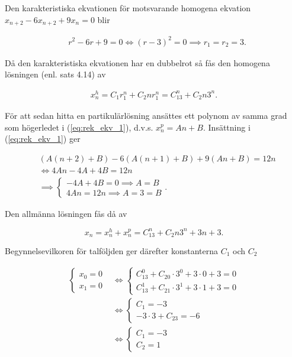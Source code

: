 \documentclass[a4paper]{article}
\begin{document}
Den karakteristiska ekvationen för motsvarande homogena ekvation $x_{n+2} - 6x_{n+2} + 9x_n = 0$ blir

\begin{align*}
	&r^2 - 6r + 9 = 0 \iff (r - 3)^2 = 0 \implies r_1 = r_2 = 3.
\end{align*}

Då den karakteristiska ekvationen har en dubbelrot så fås den homogena lösningen (enl. sats 4.14) av

\begin{align*}
	x_n^h = C_1r_1^n + C_2nr_1^n = C_13^n + C_2n3^n.
\end{align*}

För att sedan hitta en partikulärlösning ansättes ett polynom av samma grad som högerledet i (\ref{eq:rek_ekv_1}), d.v.s. $x_n^p = An + B$. Insättning i (\ref{eq:rek_ekv_1}) ger

\begin{align*}
	&(A(n+2) + B) - 6(A(n+1) + B) + 9(An + B) = 12n\\
	&\iff 4An - 4A + 4B = 12n\\
	&\implies	\begin{cases}
					-4A + 4B = 0 \implies A = B\\
					4An = 12n \implies A = 3 = B
				\end{cases}.
\end{align*}

Den allmänna lösningen fås då av

\begin{equation*}
	x_n = x_n^h + x_n^p = C_13^n + C_2n3^n + 3n + 3.
\end{equation*}

Begynnelsevilkoren för talföljden ger därefter konstanterna $C_1$ och $C_2$

\begin{align*}
	\begin{cases}
		x_0 = 0\\
		x_1 = 0
	\end{cases}
	&\iff
	\begin{cases}
		C_13^0 + C_20\cdot3^0 + 3\cdot 0 + 3 = 0\\
		C_13^1 + C_21\cdot3^1 + 3\cdot 1 + 3 = 0
	\end{cases}\\
	&\iff
	\begin{cases}
		C_1 = -3\\
		-3\cdot 3 + C_23 = -6
	\end{cases}\\
	&\iff
	\begin{cases}
		C_1 = -3\\
		C_2 = 1
	\end{cases}
\end{align*}
\end{document}
